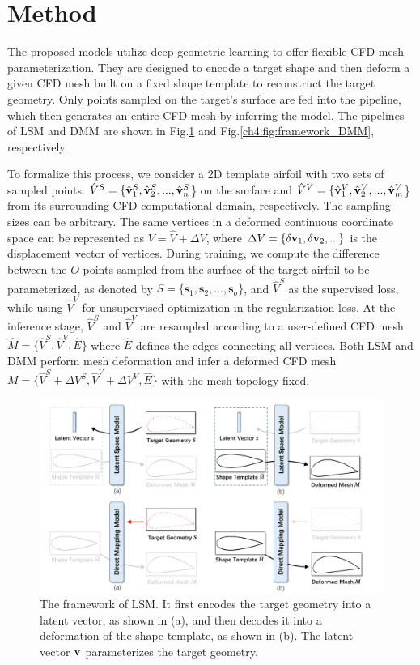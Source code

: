 \section{Method}
\label{ch4:sec:method}
The proposed models utilize deep geometric learning to offer flexible CFD mesh parameterization.
They are designed to encode a target shape and then deform a given CFD mesh built on a fixed shape template to reconstruct the target geometry. Only points sampled on the target's surface are fed into the pipeline, which then generates an entire CFD mesh by inferring the model.
The pipelines of LSM and DMM are shown in Fig.\ref{ch4:fig:framework_LSM} and Fig.\ref{ch4:fig:framework_DMM}, respectively.

To formalize this process, we consider a 2D template airfoil with two sets of sampled points: $\hat{V}^S = \{\hat{\mathbf{v}}^S_1, \hat{\mathbf{v}}^S_2,..., \hat{\mathbf{v}}^S_n$\} on the surface and $\hat{V}^V = \{\hat{\mathbf{v}}^V_1, \hat{\mathbf{v}}^V_2,..., \hat{\mathbf{v}}^V_m$\} from its surrounding CFD computational domain, respectively. The sampling sizes can be arbitrary. The same vertices in a deformed continuous coordinate space can be represented as $V=\hat{V}+\Delta V$, where $\Delta V = \{\delta {\mathbf{v}}_1, \delta {\mathbf{v}}_2,...\}$ is the displacement vector of vertices.
During training, we compute the difference between the $O$ points sampled from the surface of the target airfoil to be parameterized, as denoted by $S=\{\textbf{s}_1, \textbf{s}_2,..., \textbf{s}_o\}$, and $\hat{V}^S$ as the supervised loss, while using $\hat{V}^V$ for unsupervised optimization in the regularization loss.
At the inference stage, $\hat{V}^S$ and $\hat{V}^V$ are resampled according to a user-defined CFD mesh $\hat{M}={\{\hat{V}^S, \hat{V}^V}, \hat{E}\}$ where $\hat{E}$ defines the edges connecting all vertices. Both LSM and DMM perform mesh deformation and infer a deformed CFD mesh $M={\{\hat{V}^S + \Delta V^S, \hat{V}^V + \Delta V^V}, \hat{E}\}$ with the mesh topology fixed.

\begin{figure}[tb]
    \begin{center}
        \includegraphics[width=1\linewidth]{chapter4/fig/framework_LSM.pdf}
    \end{center}
    \caption{
        \small The framework of LSM. It first encodes the target geometry into a latent vector, as shown in (a), and then decodes it into a deformation of the shape template, as shown in (b). The latent vector $\mathbf{v}$ parameterizes the target geometry.
    }
    \label{ch4:fig:framework_LSM}
\end{figure}

